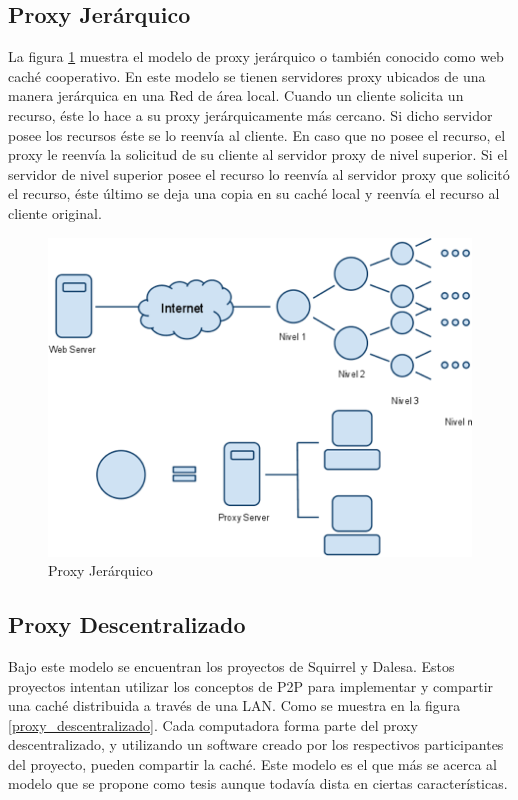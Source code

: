 
\subsection{Proxy Jerárquico}

La figura \ref{proxy_jerarquico} muestra el modelo de proxy jerárquico o también conocido como web caché cooperativo. En este modelo se tienen servidores proxy ubicados de una manera jerárquica en una Red de área local. Cuando un cliente solicita un recurso, éste lo hace a su proxy jerárquicamente más cercano. Si dicho servidor posee los recursos éste se lo reenvía al cliente. En caso que no posee el recurso, el proxy le reenvía la solicitud de su cliente al servidor proxy de nivel superior. Si el servidor de nivel superior posee el recurso lo reenvía al servidor proxy que solicitó el recurso, éste último se deja una copia en su caché local y reenvía el recurso al cliente original.

\begin{figure}[h]
  \centering
    \includegraphics[scale=0.75]{gfx/proxy_jerarquico}
  \caption{Proxy Jerárquico}
  \label{proxy_jerarquico}
\end{figure}


\subsection{Proxy Descentralizado}

Bajo este modelo se encuentran los proyectos de Squirrel y Dalesa. Estos proyectos intentan utilizar los conceptos de P2P para implementar y compartir una caché distribuida a través de una LAN. Como se muestra en la figura \ref{proxy_descentralizado}. Cada computadora forma parte del proxy descentralizado, y utilizando un software creado por los respectivos participantes del proyecto, pueden compartir la caché. Este modelo es el que más se acerca al modelo que se propone como tesis aunque todavía dista en ciertas características.

